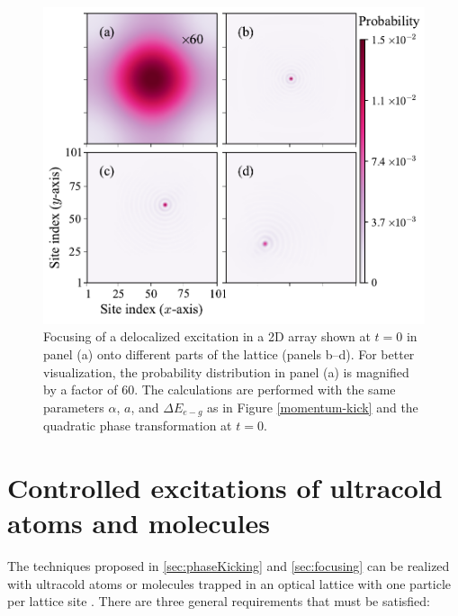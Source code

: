 \begin{figure}[htbp]
\centering
\includegraphics[width=\linewidth]{focusing-2d.pdf}
\caption{Focusing of a delocalized excitation in a 2D array shown
at $t=0$ in panel (a) onto different parts of the lattice (panels
b--d). For better visualization, the probability  distribution in panel (a) is magnified by a factor of 60. The calculations are performed with
the same parameters $\alpha$, $a$, and $\Delta E_{e-g}$ as in
Figure \ref{momentum-kick} and the quadratic phase transformation
at $t=0$.
 }\label{focusing-2d}
\end{figure}


\section{Controlled excitations of ultracold atoms and molecules}
\label{sec:excitationAtomMolecule}

The techniques proposed in \autoref{sec:phaseKicking}  and \autoref{sec:focusing}  can be realized with ultracold atoms or molecules trapped in an
optical lattice  with one particle per lattice site \cite{atom-mott1, atom-mott2, atom-mott3, Ye-arrays-PRL12}.
There are three general requirements that must be satisfied:

